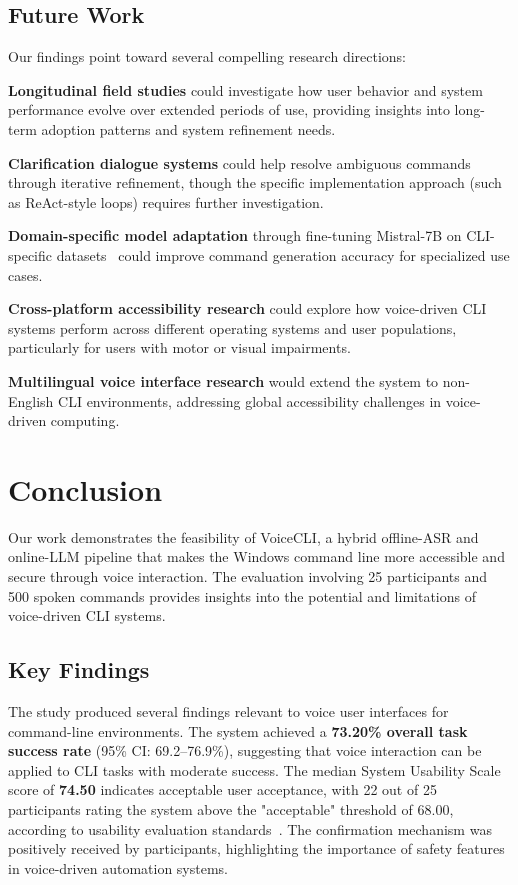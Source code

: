 \documentclass[a4paper,12pt]{article}
\begin{document}
\subsection{Future Work}  
\label{sec:future}  
\noindent Our findings point toward several compelling research directions:

\textbf{Longitudinal field studies} could investigate how user behavior and system performance evolve over extended periods of use, providing insights into long-term adoption patterns and system refinement needs.

\textbf{Clarification dialogue systems} could help resolve ambiguous commands through iterative refinement, though the specific implementation approach (such as ReAct-style loops) requires further investigation.

\textbf{Domain-specific model adaptation} through fine-tuning Mistral-7B on CLI-specific datasets~\cite{ref26} could improve command generation accuracy for specialized use cases.

\textbf{Cross-platform accessibility research} could explore how voice-driven CLI systems perform across different operating systems and user populations, particularly for users with motor or visual impairments.

\textbf{Multilingual voice interface research} would extend the system to non-English CLI environments, addressing global accessibility challenges in voice-driven computing.
\newpage
\section{Conclusion}  

Our work demonstrates the feasibility of VoiceCLI, a hybrid offline-ASR and online-LLM pipeline that makes the Windows command line more accessible and secure through voice interaction. The evaluation involving 25 participants and 500 spoken commands provides insights into the potential and limitations of voice-driven CLI systems.

\subsection{Key Findings}

The study produced several findings relevant to voice user interfaces for command-line environments. The system achieved a \textbf{73.20\% overall task success rate} (95\% CI: 69.2–76.9\%), suggesting that voice interaction can be applied to CLI tasks with moderate success. The median System Usability Scale score of \textbf{74.50} indicates acceptable user acceptance, with 22 out of 25 participants rating the system above the "acceptable" threshold of 68.00, according to usability evaluation standards~\cite{ref15}. The confirmation mechanism was positively received by participants, highlighting the importance of safety features in voice-driven automation systems.
\end{document}

